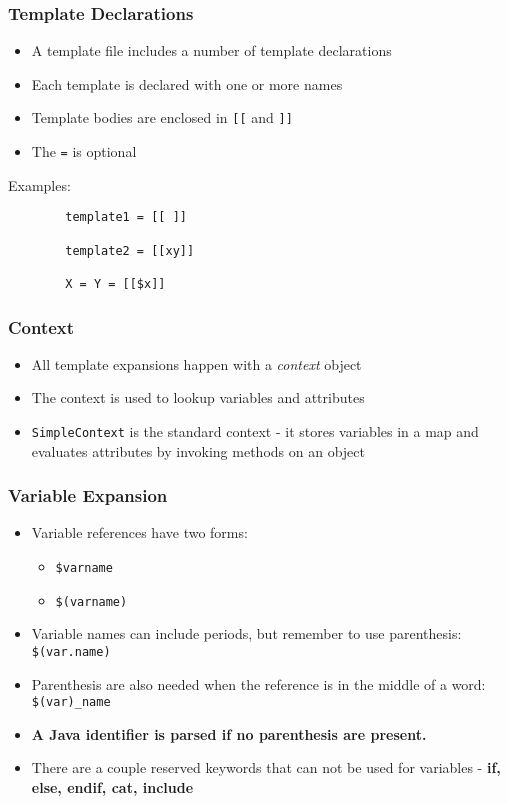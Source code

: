 \documentclass[a4paper,12pt,presentation]{beamer}
\begin{document}
\begin{frame}[fragile]
    \frametitle{Template Declarations}

    \begin{itemize}
        \item A template file includes a number of template declarations
        \item Each template is declared with one or more names
        \item Template bodies are enclosed in \verb'[[' and \verb']]'
        \item The \verb'=' is optional
    \end{itemize}

    Examples:
    \begin{verbatim}
        template1 = [[ ]]

        template2 = [[xy]]

        X = Y = [[$x]]
    \end{verbatim}
\end{frame}

\begin{frame}[fragile]
    \frametitle{Context}

    \begin{itemize}
        \item All template expansions happen with a \emph{context} object
        \item The context is used to lookup variables and attributes
        \item \verb'SimpleContext' is the standard context - it stores variables
            in a map and evaluates attributes by invoking methods on an object
    \end{itemize}
    
\end{frame}

\begin{frame}[fragile]
    \frametitle{Variable Expansion}

    \begin{itemize}
        \item Variable references have two forms:
            \begin{itemize}
                \item \verb'$varname'
                \item \verb'$(varname)'
            \end{itemize}
        \item Variable names can include periods, but remember to use
            parenthesis: \verb'$(var.name)'
        \item Parenthesis are also needed when the reference
            is in the middle of a word: \verb'$(var)_name'
        \item {\bf A Java identifier is parsed if no parenthesis are present.}
        \item There are a couple reserved keywords that can not be used for variables -
            \bf if, else, endif, cat, include
    \end{itemize}
    
\end{frame}
\end{document}
